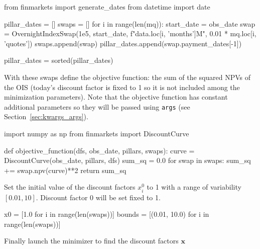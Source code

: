 \begin{ipython}
from finmarkets import generate_dates
from datetime import date

pillar_dates = []
swaps = []
for i in range(len(mq)):
    start_date = obs_date
    swap = OvernightIndexSwap(1e5, start_date,
                              f"{data.loc[i, 'months']}M",
                              0.01 * mq.loc[i, 'quotes'])
    swaps.append(swap)
    pillar_dates.append(swap.payment_dates[-1])

pillar_dates = sorted(pillar_dates)
\end{ipython}
With these swaps define the objective function: the sum of the squared NPVs of the OIS (today's discount factor is fixed to 1 so it is not included among the minimization parameters). Note that the objective function has constant additional parameters so they will be passed using \texttt{args} (see Section~\ref{sec:kwargs_args}). 

\begin{ipython}
import numpy as np
from finmarkets import DiscountCurve 

def objective_function(dfs, obs_date, pillars, swaps):
    curve = DiscountCurve(obs_date, pillars, dfs)
    sum_sq = 0.0
    for swap in swaps:
        sum_sq += swap.npv(curve)**2
    return sum_sq
\end{ipython}
Set the initial value of the discount factors $x_i^0$ to 1 with a range of variability $[0.01, 10]$. Discount factor 0 will be set fixed to 1.

\begin{ipython}
x0 = [1.0 for i in range(len(swaps))]
bounds = [(0.01, 10.0) for i in range(len(swaps))]
\end{ipython}
Finally launch the minimizer to find the discount factors $\mathbf{x}$

